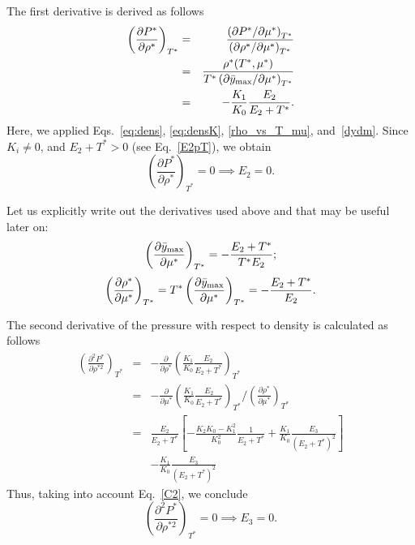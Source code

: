 \documentclass[12pt]{article}
\numberwithin{equation}{section}
\begin{document}
	The first derivative is derived as follows
	\begin{eqnarray}
		\left(\frac{\partial P^*}{\partial \rho^*}\right)_{T^*} & = & 
		\frac{\left(\partial P^* / \partial \mu^*\right)_{T^*}}{\left(\partial \rho^* / \partial \mu^* \right)_{T^*}}
		\nonumber\\
		& = & \frac{\rho^*(T^*,\mu^*)}{T^* \left(\partial \bar{y}_{\rm max} / \partial \mu^*\right)_{T^*}}
		\nonumber\\
		& = & - \frac{K_1}{K_0} \frac{E_2}{E_2 + T^*}.
	\end{eqnarray}
	Here, we applied Eqs.~\eqref{eq:dens}, \eqref{eq:densK}, \eqref{rho_vs_T_mu}, and~\eqref{dydm}. Since $K_i \neq 0$, and $E_2 + T^* > 0$ (see Eq.~\eqref{E2pT}), we obtain
	\begin{equation}
		\label{C2}
		\left(\frac{\partial P^*}{\partial \rho^*}\right)_{T^*} = 0 \implies E_2 = 0.
	\end{equation}
	
	Let us explicitly write out the derivatives used above and that may be useful later on:
	\begin{equation}
		\left( \frac{\partial \bar{y}_{\rm max}}{\partial \mu^*} \right)_{T^*} = -\frac{E_2 + T^*}{T^* E_2};
	\end{equation}
	\begin{equation}
		\left( \frac{\partial \rho^*}{\partial \mu^*} \right)_{T^*} = T^* \left( \frac{\partial \bar{y}_{\rm max}}{\partial \mu^*} \right)_{T^*}
		= -\frac{E_2 + T^*}{E_2}.
	\end{equation}
	
	The second derivative of the pressure with respect to density is calculated as follows
	\begin{eqnarray}
		\left(\frac{\partial^2 P^*}{\partial \rho^{*2}}\right)_{T^*} & = & -\frac{\partial}{\partial \rho^*} \left(\frac{K_1}{K_0} \frac{E_2}{E_2 + T^*} \right)_{T^*}
		\nonumber\\
		& = & -\frac{\partial}{\partial \mu^*} \left(\frac{K_1}{K_0} \frac{E_2}{E_2 + T^*} \right)_{T^*} \bigg/ \left(\frac{\partial \rho^*}{\partial \mu^*}\right)_{T^*}
		\nonumber\\
		& = & \frac{E_2}{E_2 + T^*} \left[- \frac{K_2K_0 - K_1^2}{K_0^2} \frac{1}{E_2 + T^*} + \frac{K_1}{K_0} \frac{E_3}{(E_2 + T^*)^2}\right]
		\nonumber\\
		& & - \frac{K_1}{K_0} \frac{E_3}{(E_2 + T^*)^2}
	\end{eqnarray}
	Thus, taking into account Eq.~\eqref{C2}, we conclude
	\begin{equation}
		\left(\frac{\partial^2 P^*}{\partial \rho^{*2}}\right)_{T^*} = 0 \implies E_3 = 0.
	\end{equation} 
	
\end{document}
